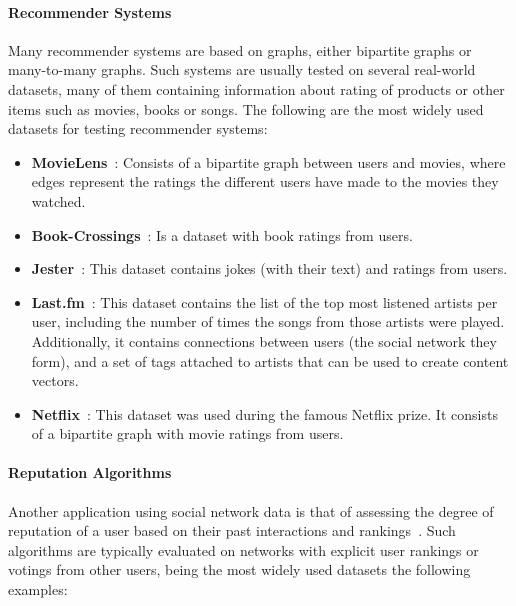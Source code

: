 \paragraph{Recommender Systems}

Many recommender systems are based on graphs, either bipartite graphs or
many-to-many graphs. Such systems are usually tested on several real-world datasets,
many of them containing information about rating of products or other items such
as movies, books or songs. The following are the most widely used datasets for
testing recommender systems:

\begin{itemize}
\item \textbf{MovieLens}~\cite{movielens}: Consists of a bipartite graph
  between users and movies, where edges represent the ratings the different
  users have made to the movies they watched.
\item \textbf{Book-Crossings}~\cite{ziegler2005improving}: Is a dataset with book ratings
  from users.
\item \textbf{Jester}~\cite{goldberg2001eigentaste}: This dataset contains jokes (with
  their text) and ratings from users.
\item \textbf{Last.fm}~\cite{hetrec}: This dataset contains the list of the top
  most listened artists per user, including the number of times the songs from
  those artists were played. Additionally, it contains connections between users
  (the social network they form), and a set of tags attached to artists that can
  be used to create content vectors.
\item \textbf{Netflix}~\cite{zhou2008large}: This dataset was used during the famous
  Netflix prize. It consists of a bipartite graph with movie ratings from users.
\end{itemize}

\paragraph{Reputation Algorithms}

Another application using social network data is that of assessing the degree of
reputation of a user based on their past interactions and
rankings~\cite{kamvar2003eigentrust,katz2006social,kumar2016edge}. Such
algorithms are typically evaluated on networks with explicit user rankings or
votings from other users, being the most widely used datasets the following
examples:

